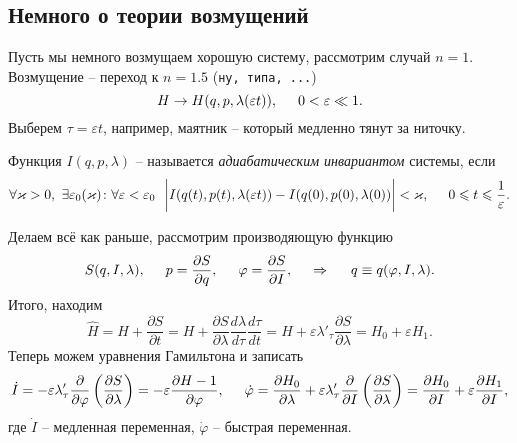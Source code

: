 \subsection{Немного о теории возмущений}

Пусть мы немного возмущаем хорошую систему, рассмотрим случай $n=1$.
Возмущение -- переход к $n=1.5$ (\texttt{ну, типа, ...})
\begin{equation*}
    H \to H(q, p, \lambda(\varepsilon t)), \hspace{5 mm} 0 < \varepsilon \ll 1.
\end{equation*}
Выберем $\tau = \varepsilon t$, например, маятник -- который медленно тянут за ниточку. 

\begin{to_def}
    Функция $I(q, p, \lambda)$ -- называется \textit{адиабатическим инвариантом} системы, если
    \begin{equation*}
        \forall \varkappa > 0, \ \exists \varepsilon_0 (\varkappa) \colon  \forall \varepsilon < \varepsilon_0 
        \ \ 
        \bigg|
            I(q(t), p(t), \lambda(\varepsilon t)) - I(q(0), p(0), \lambda(0))
        \bigg| < \varkappa,
        \hspace{5 mm}
        0 \leq t \leq \frac{1}{\varepsilon}.
    \end{equation*}
\end{to_def}


Делаем всё как раньше, рассмотрим производяющую функцию
\begin{equation*}
    S(q, I, \lambda),
    \hspace{5 mm}
    p = \frac{\partial S}{\partial q},
    \hspace{5 mm}
    \varphi = \frac{\partial S}{\partial I} ,
    \hspace{0.5cm} \Rightarrow \hspace{0.5cm}
    q \equiv q(\varphi, I, \lambda).
\end{equation*}
Итого, находим
\begin{equation*}
    \hat{H} = H + \frac{\partial S}{\partial t} = H + \frac{\partial S}{\partial \lambda} \frac{d \lambda}{d \tau} \frac{d \tau}{d t} = H + \varepsilon \lambda'_\tau \frac{\partial S}{\partial \lambda} = H_0 + \varepsilon H_1.
\end{equation*}
Теперь можем уравнения Гамильтона и записать
\begin{equation*}
    \dot{I} = - \varepsilon \lambda_\tau' \frac{\partial }{\partial \varphi} \left(
        \frac{\partial S}{\partial \lambda} 
    \right) = - \varepsilon \frac{\partial H-1}{\partial \varphi}
    ,
    \hspace{5 mm}
    \dot{\varphi} = \frac{\partial H_0}{\partial \lambda} + \varepsilon \lambda_\tau' \frac{\partial }{\partial I} \left(
        \frac{\partial S}{\partial \lambda} 
    \right) = \frac{\partial H_0}{\partial I} + \varepsilon \frac{\partial H_1}{\partial I},
\end{equation*}
где $\dot{I}$ -- медленная переменная, $\dot{\varphi}$ -- быстрая переменная.

